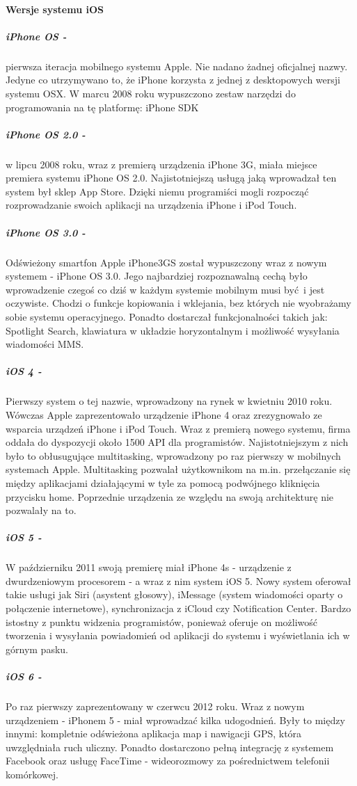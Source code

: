 \documentclass[11pt,twoside,a4paper]{report}
\begin{document}
\paragraph{Wersje systemu iOS}
\subparagraph{iPhone OS -}pierwsza iteracja mobilnego systemu Apple. Nie nadano żadnej oficjalnej nazwy. Jedyne co utrzymywano to, że iPhone korzysta z jednej z desktopowych wersji systemu OSX.\cite{iphoneOSX} 
W marcu 2008 roku wypuszczono zestaw narzędzi do programowania na tę platformę: iPhone SDK \cite{iphoneSDK}
\subparagraph{iPhone OS 2.0 -}w lipcu 2008 roku, wraz z premierą urządzenia iPhone 3G, miała miejsce premiera systemu iPhone OS 2.0. Najistotniejszą usługą jaką wprowadzał ten system był sklep App Store. Dzięki niemu programiści mogli rozpocząć rozprowadzanie swoich aplikacji na urządzenia iPhone i iPod Touch. \cite{iphone3GappStore}
\subparagraph{iPhone OS 3.0 -}Odświeżony smartfon Apple iPhone3GS został wypuszczony wraz z nowym systemem - iPhone OS 3.0. Jego najbardziej rozpoznawalną cechą było wprowadzenie czegoś co dziś w każdym systemie mobilnym musi być i jest oczywiste. Chodzi o funkcje kopiowania i wklejania, bez których nie wyobrażamy sobie systemu operacyjnego. Ponadto dostarczał funkcjonalności takich jak: Spotlight Search, klawiatura w układzie horyzontalnym i możliwość wysyłania wiadomości MMS.\cite{iphoneOS3}
\subparagraph{iOS 4 -}Pierwszy system o tej nazwie, wprowadzony na rynek w kwietniu 2010 roku. Wówczas Apple zaprezentowało urządzenie iPhone 4 oraz zrezygnowało ze wsparcia urządzeń iPhone i iPod Touch. Wraz z premierą nowego systemu, firma oddała do dyspozycji około 1500 API dla programistów. Najistotniejszym z nich było to obłusugujące multitasking, wprowadzony po raz pierwszy w mobilnych systemach Apple. Multitasking pozwalał użytkownikom na m.in. przełączanie się między aplikacjami działającymi w tyle za pomocą podwójnego kliknięcia przycisku home. Poprzednie urządzenia ze względu na swoją architekturę nie pozwalały na to.\cite{ios4}
\subparagraph{iOS 5 -}W październiku 2011 swoją premierę miał iPhone 4s - urządzenie z dwurdzeniowym procesorem - a wraz z nim system iOS 5. Nowy system oferował takie usługi jak Siri (asystent głosowy), iMessage (system wiadomości oparty o połączenie internetowe), synchronizacja z iCloud czy Notification Center. Bardzo istostny z punktu widzenia programistów, ponieważ oferuje on możliwość tworzenia i wysyłania powiadomień od aplikacji do systemu i wyświetlania ich w górnym pasku.\cite{ios5}
\subparagraph{iOS 6 -}Po raz pierwszy zaprezentowany w czerwcu 2012 roku. Wraz z nowym urządzeniem - iPhonem 5 - miał wprowadzać kilka udogodnień. Były to między innymi: kompletnie odświeżona aplikacja map i nawigacji GPS, która uwzględniała ruch uliczny. Ponadto dostarczono pełną integrację z systemem Facebook oraz usługę FaceTime - wideorozmowy za pośrednictwem telefonii komórkowej.\cite{ios6}
\end{document}
